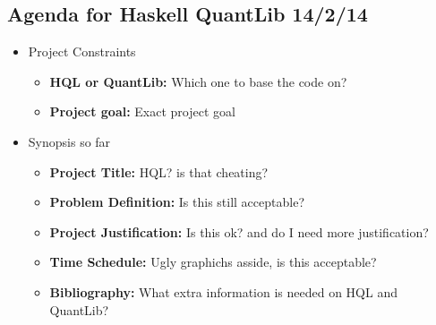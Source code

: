 \documentclass{article}
\begin{document}
\begin{center}
\section*{Agenda for Haskell QuantLib 14/2/14}
\end{center}
\begin{itemize}
\item{Project Constraints}
    \begin{itemize}
        \item{\textbf{HQL or QuantLib:}} Which one to base the code on?
        \item{\textbf{Project goal:}} Exact project goal
    \end{itemize}
\item{Synopsis so far}
    \begin{itemize}
        \item{\textbf{Project Title:}} HQL? is that cheating?
        \item{\textbf{Problem Definition:}} Is this still acceptable? 
        \item{\textbf{Project Justification:}} Is this ok? and do I need more justification?
        \item{\textbf{Time Schedule:}} Ugly graphichs asside, is this acceptable?
        \item{\textbf{Bibliography:}} What extra information is needed on HQL and QuantLib?
    \end{itemize}
\end{itemize}


\newpage

\end{document}
